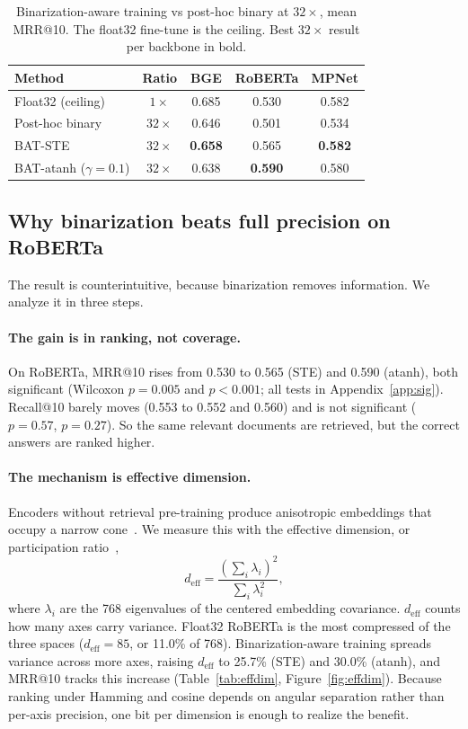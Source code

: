 \begin{table}[t]
  \centering
  \caption{Binarization-aware training vs post-hoc binary at $32\times$, mean
  MRR@10. The float32 fine-tune is the ceiling. Best $32\times$ result per
  backbone in bold.}
  \label{tab:bat}
  \begin{tabular}{lcccc}
    \toprule
    \textbf{Method} & \textbf{Ratio} & \textbf{BGE} & \textbf{RoBERTa} & \textbf{MPNet} \\
    \midrule
    Float32 (ceiling)        & $1\times$  & 0.685 & 0.530 & 0.582 \\
    Post-hoc binary          & $32\times$ & 0.646 & 0.501 & 0.534 \\
    BAT-STE                  & $32\times$ & \textbf{0.658} & 0.565 & \textbf{0.582} \\
    BAT-atanh ($\gamma{=}0.1$) & $32\times$ & 0.638 & \textbf{0.590} & 0.580 \\
    \bottomrule
  \end{tabular}
\end{table}

\subsection{Why binarization beats full precision on RoBERTa}
\label{subsec:effdim}
The result is counterintuitive, because binarization removes information. We
analyze it in three steps.

\paragraph{The gain is in ranking, not coverage.}
On RoBERTa, MRR@10 rises from 0.530 to 0.565 (STE) and 0.590 (atanh), both
significant (Wilcoxon $p=0.005$ and $p<0.001$; all tests in
Appendix~\ref{app:sig}). Recall@10 barely moves (0.553 to
0.552 and 0.560) and is not significant ($p=0.57$, $p=0.27$). So the same
relevant documents are retrieved, but the correct answers are ranked higher.

\paragraph{The mechanism is effective dimension.}
Encoders without retrieval pre-training produce anisotropic embeddings that
occupy a narrow cone~\citep{ethayarajh2019contextual}. We measure this with the
effective dimension, or participation ratio~\citep{litwinkumar2017optimal,
gao2017theory},
\begin{equation}
  d_{\mathrm{eff}} = \frac{\left(\sum_i \lambda_i\right)^2}{\sum_i \lambda_i^2},
\end{equation}
where $\lambda_i$ are the 768 eigenvalues of the centered embedding covariance.
$d_{\mathrm{eff}}$ counts how many axes carry variance. Float32 RoBERTa is the
most compressed of the three spaces ($d_{\mathrm{eff}}=85$, or 11.0\% of 768).
Binarization-aware training spreads variance across more axes, raising
$d_{\mathrm{eff}}$ to 25.7\% (STE) and 30.0\% (atanh), and MRR@10 tracks this
increase (Table~\ref{tab:effdim}, Figure~\ref{fig:effdim}). Because ranking
under Hamming and cosine depends on angular separation rather than per-axis
precision, one bit per dimension is enough to realize the benefit.

